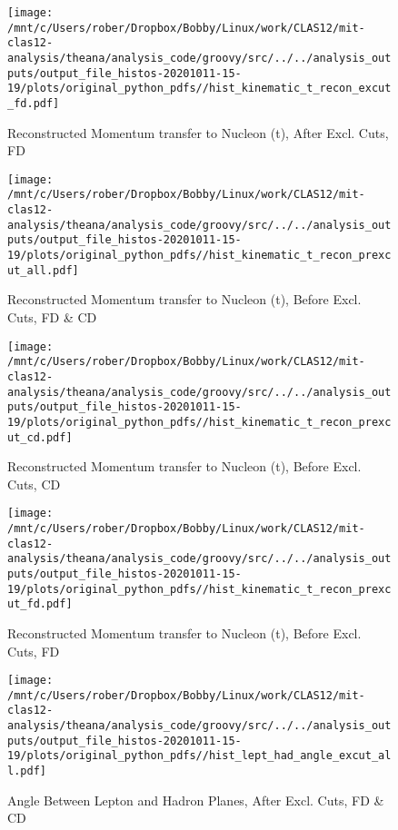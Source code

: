 \documentclass{article}
\begin{document}
\begin{landscape}
\begin{figure}[h]
        \texttt{[image: /mnt/c/Users/rober/Dropbox/Bobby/Linux/work/CLAS12/mit-clas12-analysis/theana/analysis\_code/groovy/src/../../analysis\_outputs/output\_file\_histos-20201011-15-19/plots/original\_python\_pdfs//hist\_kinematic\_t\_recon\_excut\_fd.pdf]}
        \captionsetup{textformat=empty,labelformat=blank}
        \caption{Reconstructed Momentum transfer to Nucleon (t), After Excl. Cuts, FD}
    \end{figure}
    \clearpage
    
    \begin{figure}[h]
        \centering

        \texttt{[image: /mnt/c/Users/rober/Dropbox/Bobby/Linux/work/CLAS12/mit-clas12-analysis/theana/analysis\_code/groovy/src/../../analysis\_outputs/output\_file\_histos-20201011-15-19/plots/original\_python\_pdfs//hist\_kinematic\_t\_recon\_prexcut\_all.pdf]}
        \captionsetup{textformat=empty,labelformat=blank}
        \caption{Reconstructed Momentum transfer to Nucleon (t), Before Excl. Cuts, FD \& CD}
    \end{figure}
    \clearpage
    
    \begin{figure}[h]
        \centering

        \texttt{[image: /mnt/c/Users/rober/Dropbox/Bobby/Linux/work/CLAS12/mit-clas12-analysis/theana/analysis\_code/groovy/src/../../analysis\_outputs/output\_file\_histos-20201011-15-19/plots/original\_python\_pdfs//hist\_kinematic\_t\_recon\_prexcut\_cd.pdf]}
        \captionsetup{textformat=empty,labelformat=blank}
        \caption{Reconstructed Momentum transfer to Nucleon (t), Before Excl. Cuts, CD}
    \end{figure}
    \clearpage
    
    \begin{figure}[h]
        \centering

        \texttt{[image: /mnt/c/Users/rober/Dropbox/Bobby/Linux/work/CLAS12/mit-clas12-analysis/theana/analysis\_code/groovy/src/../../analysis\_outputs/output\_file\_histos-20201011-15-19/plots/original\_python\_pdfs//hist\_kinematic\_t\_recon\_prexcut\_fd.pdf]}
        \captionsetup{textformat=empty,labelformat=blank}
        \caption{Reconstructed Momentum transfer to Nucleon (t), Before Excl. Cuts, FD}
    \end{figure}
    \clearpage
    
    \begin{figure}[h]
        \centering

        \texttt{[image: /mnt/c/Users/rober/Dropbox/Bobby/Linux/work/CLAS12/mit-clas12-analysis/theana/analysis\_code/groovy/src/../../analysis\_outputs/output\_file\_histos-20201011-15-19/plots/original\_python\_pdfs//hist\_lept\_had\_angle\_excut\_all.pdf]}
        \captionsetup{textformat=empty,labelformat=blank}
        \caption{Angle Between Lepton and Hadron Planes, After Excl. Cuts, FD \& CD}
    \end{figure}
    \clearpage
    

\end{landscape}
\end{document}
